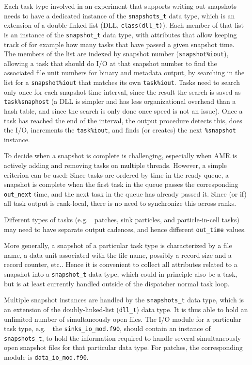 \documentclass[paper=a4,fontsize=11pt]{scrartcl}
\numberwithin{equation}{section}		%
\numberwithin{figure}{section}			%
\numberwithin{table}{section}				%
\newcommand{\codecolor}{\color{Blue}}
\newcommand{\Code}[1]{{\codecolor\texttt{#1}}}
\def\eg{e.g.\ }
\begin{document}
Each task type involved in an experiment that supports writing out snapshots needs to have a dedicated instance of the \verb|snapshots_t| data type, which is an extension of a double-linked list (DLL, \verb|class(dll_t)|).  Each member of that list is an instance of the \verb|snapshot_t| data type, with attributes that allow keeping track of for example how many tasks that have passed a given snapshot time.   The members of the list are indexed by snapshot number (\verb|snapshot%iout|), allowing a task that should do I/O at that snapshot number to find the associated file unit numbers for binary and metadata output, by searching in the list for a \verb|snapshot%iout| that matches its own \verb|task%iout|.  Tasks need to search only once for each snapshot time interval, since the result the search is saved as \verb|task%snaphost| (a DLL is simpler and has less organizational overhead than a hash table, and since the search is only done once speed is not an issue).  Once a task has reached the end of the interval, the output procedure detects this, does the I/O, increments the \verb|task%iout|, and finds (or creates) the next \verb|%snapshot| instance.

To decide when a snapshot is complete is challenging, especially when AMR is actively adding and removing tasks on multiple threads. However, a simple criterion can be used:  Since tasks are ordered by time in the ready queue, a snapshot is complete when the first task in the queue passes the corresponding \Code{out\_next} time, and the next task in the queue has already passed it.  Since (or if) all task output is rank-local, there is no need to synchronize this across ranks.

Different types of tasks (\eg\ patches, sink particles, and particle-in-cell tasks) may need to have separate output cadences, and hence different \Code{out\_time} values.

More generally, a snapshot of a particular task type is characterized by a file name, a data unit associated with the file name, possibly a record size and a record counter, etc..  Hence it is convenient to collect all attributes related to a snapshot into a \Code{snapshot\_t} data type, which could in principle also be a task, but is at least currently handled outside of the dispatcher normal task loop.

Multiple snapshot instances are handled by the \Code{snapshots\_t} data type, which is an extension of the doubly-linked-list (\Code{dll\_t}) data type.  It is thus able to hold an unlimited number of simultaneously open files.  The I/O module for a particular task type, \eg\ the \Code{sinks\_io\_mod.f90}, should contain an instance of \Code{snapshots\_t}, to hold the information required to handle several simultaneously open snapshot files for that particular data type.   For patches, the corresponding module is \Code{data\_io\_mod.f90}.
\end{document}
